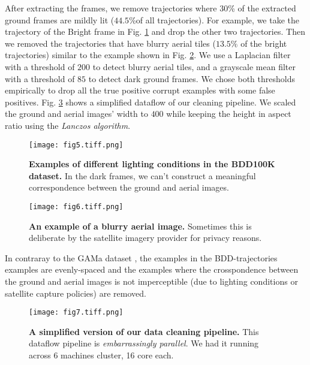 \documentclass[10pt,letterpaper]{article}
\newif\ifhighlight
\newcommand{\hlb}[1]{\ifhighlight{\hl{#1}}\else{#1}\fi}
\begin{document}
After extracting the frames, we remove trajectories where 30\% of the extracted ground frames are mildly lit ($44.5\%$of all trajectories). For example, we take the trajectory of the Bright frame in \hlb{Fig.} \ref{fig5} and drop the other two trajectories. Then we removed the trajectories that have blurry aerial tiles ($13.5\%$ of the bright trajectories) similar to the example shown in \hlb{Fig.} \ref{fig6}. We use a Laplacian filter~\cite{bib11} with a threshold of $200$ to detect blurry aerial tiles, and a grayscale mean filter with a threshold of $85$ to detect dark ground frames. We chose both thresholds empirically to drop all the true positive corrupt examples with some false positives. \hlb{Fig.} \ref{fig7} shows a simplified dataflow of our cleaning pipeline. We scaled the ground and aerial images’ width to $400$ while keeping the height in aspect ratio using the \emph{Lanczos algorithm}.

\begin{figure}[!ht]
  \caption{{\bf Examples of different lighting conditions in the BDD100K dataset.} In the dark frames, we can't construct a meaningful correspondence between the ground and aerial images.}
  \texttt{[image: fig5.tiff.png]}

  \label{fig5}
\end{figure}

\begin{figure}[!ht]
  \centering
  \caption{{\bf An example of a blurry aerial image.} Sometimes this is deliberate by the satellite imagery provider for privacy reasons.}
  \texttt{[image: fig6.tiff.png]}

  \label{fig6}
\end{figure}

\hlb{In contraray to the GAMa dataset} \cite{bib60}, \hlb{the examples in the BDD-trajectories examples are evenly-spaced and the examples where the crosspondence between the ground and aerial images is not imperceptible (due to lighting conditions or satellite capture policies) are removed.}

\begin{figure}[!ht]
  \caption{{\bf A simplified version of our data cleaning pipeline.} This dataflow pipeline is \emph{embarrassingly parallel}. We had it running across 6 machines cluster, 16 core each.}
  \texttt{[image: fig7.tiff.png]}
  \label{fig7}
\end{figure}

\FloatBarrier
\end{document}
